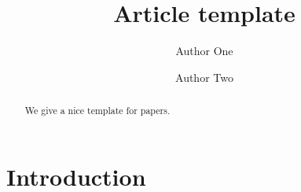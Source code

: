 \documentclass[12pt,longbibliography]{article}
\title{Article template}
\author{Author One \and Author Two}
\theoremstyle{definition}
\theoremstyle{remark}
\theoremstyle{example}
\begin{document}
\maketitle

\begin{abstract}
  We give a nice template for papers.
\end{abstract}

\tableofcontents

\section{Introduction}
\label{sec:intro}






\end{document}
